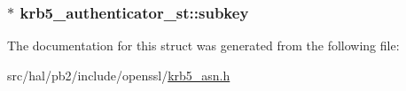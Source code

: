 \subsubsection[{\texorpdfstring{subkey}{subkey}}]{$\ast$ krb5\+\_\+authenticator\+\_\+st\+::subkey}\hypertarget{structkrb5__authenticator__st_a03ed3e43b6e55c3109d5531ee904b8bf}{}\label{structkrb5__authenticator__st_a03ed3e43b6e55c3109d5531ee904b8bf}


The documentation for this struct was generated from the following file\+:\begin{DoxyCompactItemize}
\item 
src/hal/pb2/include/openssl/\hyperlink{krb5__asn_8h}{krb5\+\_\+asn.\+h}\end{DoxyCompactItemize}
